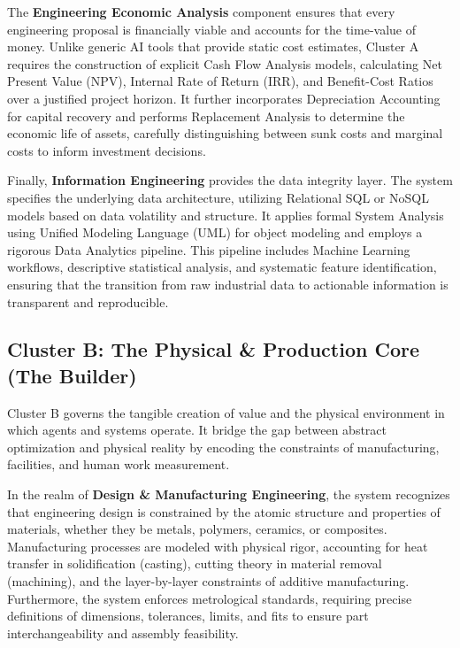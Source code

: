 \documentclass[12pt,a4paper]{article}
\begin{document}
The \textbf{Engineering Economic Analysis} component ensures that every engineering proposal is financially viable and accounts for the time-value of money. Unlike generic AI tools that provide static cost estimates, Cluster A requires the construction of explicit Cash Flow Analysis models, calculating Net Present Value (NPV), Internal Rate of Return (IRR), and Benefit-Cost Ratios over a justified project horizon. It further incorporates Depreciation Accounting for capital recovery and performs Replacement Analysis to determine the economic life of assets, carefully distinguishing between sunk costs and marginal costs to inform investment decisions.

Finally, \textbf{Information Engineering} provides the data integrity layer. The system specifies the underlying data architecture, utilizing Relational SQL or NoSQL models based on data volatility and structure. It applies formal System Analysis using Unified Modeling Language (UML) for object modeling and employs a rigorous Data Analytics pipeline. This pipeline includes Machine Learning workflows, descriptive statistical analysis, and systematic feature identification, ensuring that the transition from raw industrial data to actionable information is transparent and reproducible.

\subsection{Cluster B: The Physical \& Production Core (The Builder)}

Cluster B governs the tangible creation of value and the physical environment in which agents and systems operate. It bridge the gap between abstract optimization and physical reality by encoding the constraints of manufacturing, facilities, and human work measurement.

In the realm of \textbf{Design \& Manufacturing Engineering}, the system recognizes that engineering design is constrained by the atomic structure and properties of materials, whether they be metals, polymers, ceramics, or composites. Manufacturing processes are modeled with physical rigor, accounting for heat transfer in solidification (casting), cutting theory in material removal (machining), and the layer-by-layer constraints of additive manufacturing. Furthermore, the system enforces metrological standards, requiring precise definitions of dimensions, tolerances, limits, and fits to ensure part interchangeability and assembly feasibility.
\end{document}
